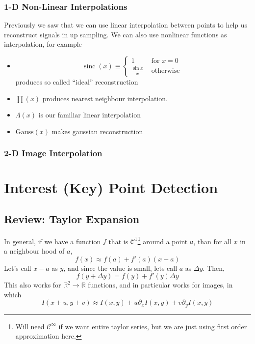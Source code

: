 \documentclass[11pt]{article}
\newcommand{\real}{\mathbb{R}}
\begin{document}
\subsubsection{1-D Non-Linear Interpolations}
Previously we saw that we can use linear interpolation between points to help us reconstruct signals in up sampling. We can also use nonlinear functions as interpolation, for example
\begin{itemize}
	\item \begin{equation}
		\operatorname{sinc}(x) \equiv \left\{\begin{array}{ll}
			1 & \text { for } x=0 \\
			\frac{\sin x}{x} & \text { otherwise }
		\end{array}\right.
	\end{equation} produces so called ``ideal'' reconstruction
	\item $\prod(x)$ produces nearest neighbour interpolation. 
	\item $\Lambda(x)$ is our familiar linear interpolation
	\item $\text{Gauss}(x)$ makes gaussian reconstruction
\end{itemize}


\subsubsection{2-D Image Interpolation}


\section{Interest (Key) Point Detection}
\subsection{Review: Taylor Expansion}
In general, if we have a function $f$ that is $\mathcal C^1$\footnote{Will need $\mathcal C^\infty$ if we want entire taylor series, but we are just using first order approximation here. } around a point $a$, than for all $x$ in a neighbour hood of $a$, 
\begin{equation}
	f(x) \approx f(a) + f'(a)(x - a)
\end{equation}
Let's call $x - a$ as $y$, and since the value is small, lets call $a$ as $\Delta y$. Then,
\begin{equation}
	f(y + \Delta y) = f(y) + f'(y)\Delta y
\end{equation}
This also works for $\real^2 \rightarrow \real$ functions, and in particular works for images, in which
\begin{equation}
	I(x+u,y+v) \approx I(x, y) + u\partial_x I(x, y) + v\partial_y I (x, y)
\end{equation}
\end{document}
